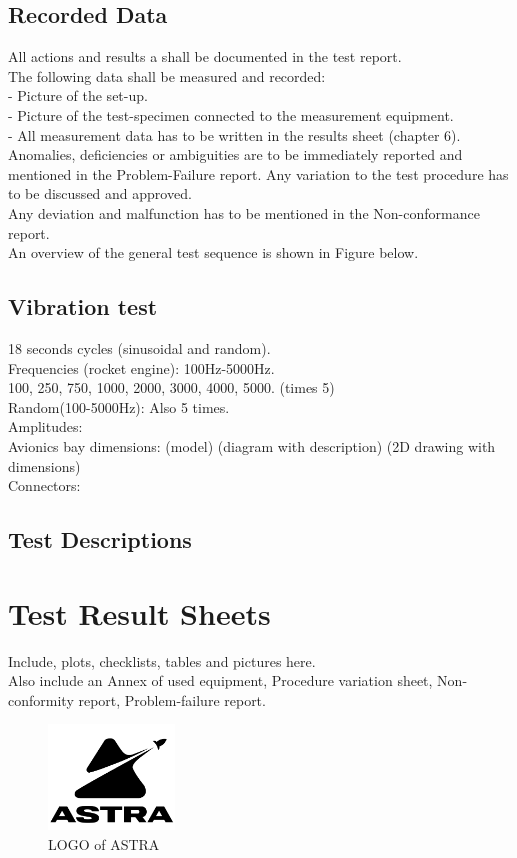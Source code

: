\documentclass[12pt,a4paper,numbers=endperiod]{article}
\begin{document}
\subsection{Recorded Data}
All actions and results a shall be documented in the test report.\\
The following data shall be measured and recorded:\\
- Picture of the set-up.\\
- Picture of the test-specimen connected to the measurement equipment.\\
- All measurement data has to be written in the results sheet (chapter 6).\\
Anomalies, deficiencies or ambiguities are to be immediately reported and mentioned in the Problem-Failure report. Any variation to the test procedure has to be discussed and approved.\\
Any deviation and malfunction has to be mentioned in the Non-conformance report.\\
An overview of the general test sequence is shown in Figure below.

\subsection{Vibration test}
18 seconds cycles (sinusoidal and random).\\
Frequencies (rocket engine): 100Hz-5000Hz.\\
100, 250, 750, 1000, 2000, 3000, 4000, 5000. (times 5)\\
Random(100-5000Hz): Also 5 times.\\
Amplitudes: \\
Avionics bay dimensions: (model) (diagram with description) (2D drawing with dimensions) \\
Connectors: \\



\subsection{Test Descriptions}
\newpage
\section{Test Result Sheets}

\noindent
Include, plots, checklists, tables and pictures here.\\
Also include an Annex of used equipment, Procedure variation sheet, Non-conformity report, Problem-failure report.
\begin{figure}[H]
\centering
\includegraphics[width=0.3\textwidth]{Official_ASTRA_LOGO.png}
\caption{LOGO of ASTRA}
\label{logo}
\end{figure}
\end{document}
